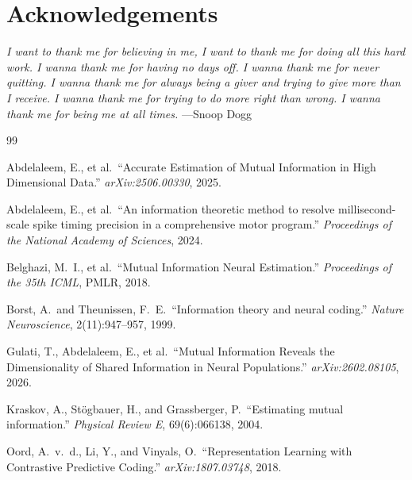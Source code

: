 \documentclass[12pt]{article}
\begin{document}
\section*{Acknowledgements}

\textit{I want to thank me for believing in me, I want to thank me for
doing all this hard work.  I wanna thank me for having no days off.
I wanna thank me for never quitting.  I wanna thank me for always being
a giver and trying to give more than I receive.  I wanna thank me for
trying to do more right than wrong.  I wanna thank me for being me at
all times.}
\hfill —Snoop Dogg


\begin{thebibliography}{99}

Abdelaleem, E., et al.\
``Accurate Estimation of Mutual Information in High Dimensional Data.''
\emph{arXiv:2506.00330}, 2025.

Abdelaleem, E., et al.\
``An information theoretic method to resolve millisecond-scale spike timing
precision in a comprehensive motor program.''
\emph{Proceedings of the National Academy of Sciences}, 2024.

Belghazi, M.\ I., et al.\
``Mutual Information Neural Estimation.''
\emph{Proceedings of the 35th ICML}, PMLR, 2018.

Borst, A.\ and Theunissen, F.\ E.\
``Information theory and neural coding.''
\emph{Nature Neuroscience}, 2(11):947--957, 1999.

Gulati, T., Abdelaleem, E., et al.\
``Mutual Information Reveals the Dimensionality of Shared Information in
Neural Populations.''
\emph{arXiv:2602.08105}, 2026.

Kraskov, A., St{\"o}gbauer, H., and Grassberger, P.\
``Estimating mutual information.''
\emph{Physical Review E}, 69(6):066138, 2004.

Oord, A.\ v.\ d., Li, Y., and Vinyals, O.\
``Representation Learning with Contrastive Predictive Coding.''
\emph{arXiv:1807.03748}, 2018.


\end{thebibliography}
\end{document}
